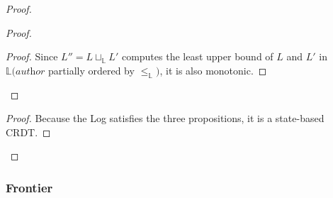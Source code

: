 \documentclass[9pt, oneside]{article}   	%
\begin{document}
\begin{proof}
\begin{proof}
		\begin{proof}
			Since $L'' = L \sqcup_\mathds{L} L'$ computes the least upper bound of $L$ and $L'$ in $\mathds{L}(\textit{author}$ partially ordered by $\leq_\mathds{L})$, it is also monotonic.
		\end{proof}
	\end{proof}
	
	\qedstep{}
	\begin{proof}
		Because the Log satisfies the three propositions, it is a state-based CRDT.
	\end{proof}
\end{proof}

\subsubsection{Frontier}
\label{sec:proofs:convergence:frontier}
\end{document}
